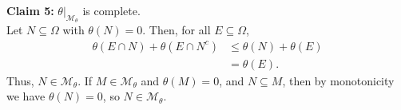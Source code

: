 \documentclass[10pt]{extarticle}
\begin{document}
\begin{description}
          \textbf{Claim 5:} $\theta|_{\mathcal{M}_{\theta}}$ is complete.\\

          Let $N\subseteq \Omega$ with $\theta(N) = 0$. Then, for all $E\subseteq \Omega$,
          \begin{align*}
            \theta(E\cap N) + \theta(E\cap N^{c}) &\leq \theta(N) + \theta(E)\\
                                                  &= \theta(E).
          \end{align*}
          Thus, $N\in \mathcal{M}_{\theta}$. If $M\in \mathcal{M}_{\theta}$ and $\theta(M) = 0$, and $N\subseteq M$, then by monotonicity we have $\theta(N) = 0$, so $N\in \mathcal{M}_{\theta}$.
  \end{description}
\end{document}
